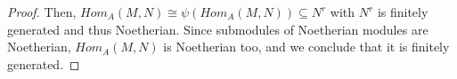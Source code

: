 \begin{problem}
\begin{enumerate}[label=(\theproblem.\arabic*),ref=\theproblem.\arabic*]
\begin{sol}
\begin{proof}
                    Then, $Hom_A(M,N) \cong \psi(Hom_A(M,N)) \subseteq N^r$ with $N^r$ is finitely generated and thus Noetherian.
                    Since submodules of Noetherian modules are Noetherian, $Hom_A(M,N)$ is Noetherian too, and we conclude that it is finitely generated.
                \end{proof}
            \end{sol}
    \end{enumerate}
\end{problem}